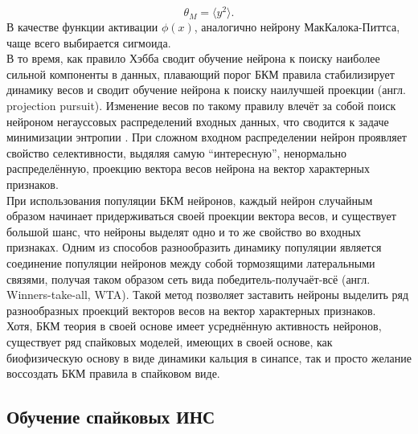 \documentclass[a4paper,10pt]{article}
\begin{document}
\begin{equation}
\theta_{M} = \langle y^2 \rangle.
\end{equation}
\indent В качестве функции активации $\phi(x)$, аналогично нейрону МакКалока-Питтса, чаще всего выбирается сигмоида.\\ 
\indent В то время, как правило Хэбба сводит обучение нейрона к поиску наиболее сильной компоненты в данных, плавающий порог БКМ правила стабилизирует динамику весов и сводит обучение нейрона к поиску наилучшей проекции \cite{friedman1973projection} (англ. projection pursuit). Изменение весов по такому правилу влечёт за собой поиск нейроном негауссовых распределений входных данных, что сводится к задаче минимизации энтропии \cite{bcm_book}. При сложном входном распределении нейрон проявляет свойство селективности, выдяляя самую ``интересную'', ненормально распределённую, проекцию вектора весов нейрона на вектор характерных признаков.\\
\indent При использования популяции БКМ нейронов, каждый нейрон случайным образом начинает придерживаться своей проекции вектора весов, и существует большой шанс, что нейроны выделят одно и то же свойство во входных признаках. Одним из способов разнообразить динамику популяции является соединение популяции нейронов между собой тормозящими латеральными связями, получая таком образом сеть вида победитель-получаёт-всё (англ. Winners-take-all, WTA). Такой метод позволяет заставить нейроны выделить ряд разнообразных проекций векторов весов на вектор характерных признаков.\\
\indent Хотя, БКМ теория в своей основе имеет усреднённую активность нейронов, существует ряд спайковых моделей, имеющих в своей основе, как биофизическую основу в виде динамики кальция в синапсе\cite{ShouvalCaBCM}, так и просто желание воссоздать БКМ правила в спайковом виде\cite{PfisterTriple}.
\subsection{Обучение спайковых ИНС}
\end{document}
